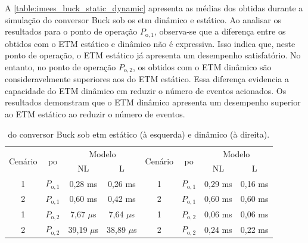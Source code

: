 A \autoref{table:imees_buck_static_dynamic} apresenta as médias dos  obtidas durante a simulação do conversor Buck sob os \acrshort{etm} dinâmico e estático. Ao analisar os resultados para o ponto de operação $P_{\mathrm{o}, 1}$, observa-se que a diferença entre os  obtidos com o ETM estático e dinâmico não é expressiva. Isso indica que, neste ponto de operação, o ETM estático já apresenta um desempenho satisfatório. No entanto, no ponto de operação $P_{\mathrm{o}, 2}$, os  obtidos com o ETM dinâmico são consideravelmente superiores aos do ETM estático. Essa diferença evidencia a capacidade do ETM dinâmico em reduzir o número de eventos acionados. Os resultados demonstram que o ETM dinâmico apresenta um desempenho superior ao ETM estático ao reduzir o número de eventos.

\vspace{12pt}
\begin{table}[H]
  \centering
  \captionsetup{justification=centering}
  \setlength{\tabcolsep}{10pt}
  \begin{tabular}{cccccccc}
    \toprule
    \multirow{2}{*}{\centering Cenário} & \multirow{2}{*}{\centering \acrshort{po}} & \multicolumn{2}{c}{\centering Modelo} & \multirow{2}{*}{\centering Cenário} & \multirow{2}{*}{\centering \acrshort{po}} & \multicolumn{2}{c}{\centering Modelo}                     \\
    \cmidrule(lr){3-4} \cmidrule(lr){7-8}                      &                                           & NL                                    & L                                   &                                           &                                       & NL      & L       \\
    \midrule
    1                                   & $P_{\mathrm{o}, 1}$                       & 0,28 ms                               & 0,26 ms                             & 1                                         & $P_{\mathrm{o}, 1}$                   & 0,29 ms & 0,16 ms \\
    2                                   & $P_{\mathrm{o}, 1}$                       & 0,60 ms                               & 0,42 ms                             & 2                                         & $P_{\mathrm{o}, 1}$                   & 0,60 ms & 0,60 ms \\
    1                                   & $P_{\mathrm{o}, 2}$                       & 7,67 $\mu$s                           & 7,64 $\mu$s                         & 1                                         & $P_{\mathrm{o}, 2}$                   & 0,06 ms & 0,06 ms \\
    2                                   & $P_{\mathrm{o}, 2}$                       & 39,19 $\mu$s                          & 38,89 $\mu$s                        & 2                                         & $P_{\mathrm{o}, 2}$                   & 0,24 ms & 0,22 ms \\
    \bottomrule
  \end{tabular}
  \caption{ do conversor Buck sob \acrshort{etm} estático (à esquerda) e dinâmico (à direita).}
  \label{table:imees_buck_static_dynamic}
\end{table}

